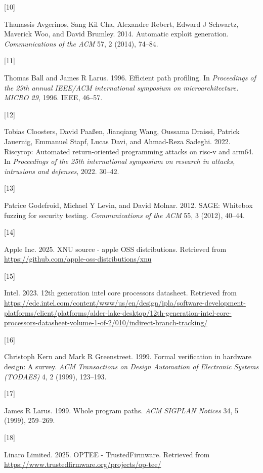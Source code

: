 \documentclass[a4paper, nobind]{templates/ociamthesis}
\newlength{\cslhangindent}
\newlength{\csllabelwidth}
\newenvironment{CSLReferences}[2] %
{\begin{list}{}{%
	\setlength{\itemindent}{0pt}
	\setlength{\leftmargin}{0pt}
	\setlength{\parsep}{0pt}
	\ifodd #1
	\setlength{\leftmargin}{\cslhangindent}
	\setlength{\itemindent}{-1\cslhangindent}
	\fi
	\setlength{\itemsep}{#2\baselineskip}}}
{\end{list}}
\newcommand{\CSLLeftMargin}[1]{\parbox[t]{\csllabelwidth}{\strut#1\strut}}
\newcommand{\CSLRightInline}[1]{\parbox[t]{\linewidth - \csllabelwidth}{\strut#1\strut}}
\begin{document}
\begin{CSLReferences}{0}{0}
\CSLLeftMargin{{[}10{]} }%
\CSLRightInline{Thanassis Avgerinos, Sang Kil Cha, Alexandre Rebert, Edward J Schwartz, Maverick Woo, and David Brumley. 2014. Automatic exploit generation. \emph{Communications of the ACM} 57, 2 (2014), 74--84.}

\CSLLeftMargin{{[}11{]} }%
\CSLRightInline{Thomas Ball and James R Larus. 1996. Efficient path profiling. In \emph{Proceedings of the 29th annual IEEE/ACM international symposium on microarchitecture. MICRO 29}, 1996. IEEE, 46--57.}

\CSLLeftMargin{{[}12{]} }%
\CSLRightInline{Tobias Cloosters, David Paaßen, Jianqiang Wang, Oussama Draissi, Patrick Jauernig, Emmanuel Stapf, Lucas Davi, and Ahmad-Reza Sadeghi. 2022. Riscyrop: Automated return-oriented programming attacks on risc-v and arm64. In \emph{Proceedings of the 25th international symposium on research in attacks, intrusions and defenses}, 2022. 30--42.}

\CSLLeftMargin{{[}13{]} }%
\CSLRightInline{Patrice Godefroid, Michael Y Levin, and David Molnar. 2012. SAGE: Whitebox fuzzing for security testing. \emph{Communications of the ACM} 55, 3 (2012), 40--44.}

\CSLLeftMargin{{[}14{]} }%
\CSLRightInline{Apple Inc. 2025. XNU source - apple OSS distributions. Retrieved from \url{https://github.com/apple-oss-distributions/xnu}}

\CSLLeftMargin{{[}15{]} }%
\CSLRightInline{Intel. 2023. 12th generation intel core processors datasheet. Retrieved from \url{https://edc.intel.com/content/www/us/en/design/ipla/software-development-platforms/client/platforms/alder-lake-desktop/12th-generation-intel-core-processors-datasheet-volume-1-of-2/010/indirect-branch-tracking/}}

\CSLLeftMargin{{[}16{]} }%
\CSLRightInline{Christoph Kern and Mark R Greenstreet. 1999. Formal verification in hardware design: A survey. \emph{ACM Transactions on Design Automation of Electronic Systems (TODAES)} 4, 2 (1999), 123--193.}

\CSLLeftMargin{{[}17{]} }%
\CSLRightInline{James R Larus. 1999. Whole program paths. \emph{ACM SIGPLAN Notices} 34, 5 (1999), 259--269.}

\CSLLeftMargin{{[}18{]} }%
\CSLRightInline{Linaro Limited. 2025. OPTEE - TrustedFirmware. Retrieved from \url{https://www.trustedfirmware.org/projects/op-tee/}}


\end{CSLReferences}
\end{document}

